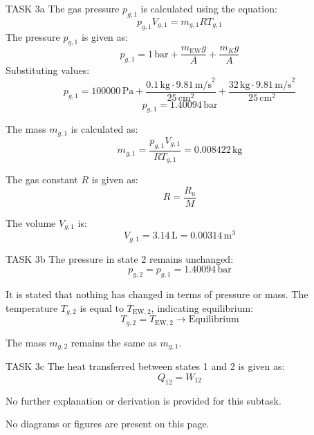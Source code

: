 TASK 3a  
The gas pressure \( p_{g,1} \) is calculated using the equation:  
\[
p_{g,1} V_{g,1} = m_{g,1} R T_{g,1}
\]  
The pressure \( p_{g,1} \) is given as:  
\[
p_{g,1} = 1 \, \text{bar} + \frac{m_{\text{EW}} g}{A} + \frac{m_K g}{A}
\]  
Substituting values:  
\[
p_{g,1} = 100000 \, \text{Pa} + \frac{0.1 \, \text{kg} \cdot 9.81 \, \text{m/s}^2}{25 \, \text{cm}^2} + \frac{32 \, \text{kg} \cdot 9.81 \, \text{m/s}^2}{25 \, \text{cm}^2}
\]  
\[
p_{g,1} = 1.40094 \, \text{bar}
\]  

The mass \( m_{g,1} \) is calculated as:  
\[
m_{g,1} = \frac{p_{g,1} V_{g,1}}{R T_{g,1}} = 0.008422 \, \text{kg}
\]  

The gas constant \( R \) is given as:  
\[
R = \frac{R_u}{M}
\]  

The volume \( V_{g,1} \) is:  
\[
V_{g,1} = 3.14 \, \text{L} = 0.00314 \, \text{m}^3
\]  

TASK 3b  
The pressure in state 2 remains unchanged:  
\[
p_{g,2} = p_{g,1} = 1.40094 \, \text{bar}
\]  

It is stated that nothing has changed in terms of pressure or mass. The temperature \( T_{g,2} \) is equal to \( T_{\text{EW},2} \), indicating equilibrium:  
\[
T_{g,2} = T_{\text{EW},2} \rightarrow \text{Equilibrium}
\]  

The mass \( m_{g,2} \) remains the same as \( m_{g,1} \).  

TASK 3c  
The heat transferred between states 1 and 2 is given as:  
\[
Q_{12} = W_{12}
\]  

No further explanation or derivation is provided for this subtask.  

No diagrams or figures are present on this page.